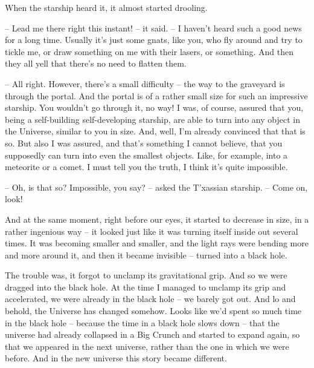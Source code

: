 \documentclass[ebook,oneside,final,openright]{memoir}
\begin{document}
When the starship heard it, it almost started drooling.\par
– Lead me there right this instant! – it said. – I haven’t heard such a good news for a long time. Usually it’s just some gnats, like you, who fly around and try to tickle me, or draw something on me with their lasers, or something. And then they all yell that there’s no need to flatten them.\par
– All right. However, there’s a small difficulty – the way to the graveyard is through the portal. And the portal is of a rather small size for such an impressive starship. You wouldn’t go through it, no way! I was, of course, assured that you, being a self-building self-developing starship, are able to turn into any object in the Universe, similar to you in size. And, well, I’m already convinced that that is so. But also I was assured, and that’s something I cannot believe, that you supposedly can turn into even the smallest objects. Like, for example, into a meteorite or a comet. I must tell you the truth, I think it’s quite impossible.\par
– Oh, is that so? Impossible, you say? – asked the T’xassian starship. – Come on, look!\par
\par
And at the same moment, right before our eyes, it started to decrease in size, in a rather ingenious way – it looked just like it was turning itself inside out several times. It was becoming smaller and smaller, and the light rays were bending more and more around it, and then it became invisible – turned into a black hole.\par
\par
The trouble was, it forgot to unclamp its gravitational grip. And so we were dragged into the black hole. At the time I managed to unclamp its grip and accelerated, we were already in the black hole – we barely got out. And lo and behold, the Universe has changed somehow. Looks like we’d spent so much time in the black hole – because the time in a black hole slows down – that the universe had already collapsed in a Big Crunch and started to expand again, so that we appeared in the next universe, rather than the one in which we were before. And in the new universe this story became different.
\end{document}

